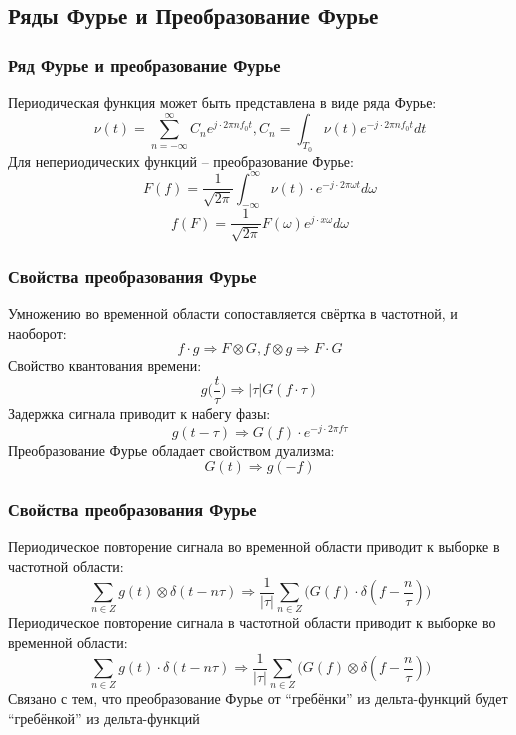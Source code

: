 \documentclass[utf8]{beamer}
\begin{document}
\subsection{Ряды Фурье и Преобразование Фурье}
\begin{frame}
\frametitle{Ряд Фурье и преобразование Фурье}
Периодическая функция может быть представлена в виде ряда Фурье:
$$
\nu (t) = \sum_{n=-\infty}^{\infty}C_n e^{j\cdot 2 \pi n f_0 t}, C_n = \int_{T_0} \nu (t) e^{-j\cdot 2\pi nf_0t}dt
$$
Для непериодических функций -- преобразование Фурье:
$$
F(f) = \frac{1}{\sqrt{2 \pi}}\int_{-\infty}^{\infty}\nu(t)\cdot e^{-j\cdot 2\pi \omega t}d\omega
$$
$$
f(F) = \frac{1}{\sqrt{2 \pi}}F(\omega)e^{j\cdot x\omega}d\omega
$$
\end{frame}
\begin{frame}
\frametitle{Свойства преобразования Фурье}
Умножению во временной области сопоставляется свёртка в частотной, и наоборот:
$$
f \cdot g \Rightarrow F \otimes G, f \otimes g \Rightarrow F \cdot G
$$
Свойство квантования времени:
$$
g\Big(\frac{t}{\tau}\Big) \Rightarrow |\tau|G(f\cdot \tau)
$$
Задержка сигнала приводит к набегу фазы:
$$
g(t-\tau) \Rightarrow G(f)\cdot e^{-j\cdot 2\pi f \tau}
$$
Преобразование Фурье обладает свойством дуализма:
$$
G(t) \Rightarrow g(-f)
$$
\end{frame}
\begin{frame}
\frametitle{Свойства преобразования Фурье}
Периодическое повторение сигнала во временной области приводит к выборке в частотной области:
$$
\sum_{n\in Z} g(t) \otimes \delta (t - n\tau) \Rightarrow \frac{1}{|\tau|}\sum_{n \in Z}\Bigg(G(f)\cdot \delta(f - \frac{n}{\tau})\Bigg)
$$
Периодическое повторение сигнала в частотной области приводит к выборке во временной области:
$$
\sum_{n\in Z} g(t) \cdot \delta (t - n\tau) \Rightarrow \frac{1}{|\tau|}\sum_{n \in Z}\Bigg(G(f)\otimes \delta(f - \frac{n}{\tau})\Bigg)
$$
Связано с тем, что преобразование Фурье от ``гребёнки'' из дельта-функций будет ``гребёнкой'' из дельта-функций
\end{frame}
\end{document}
